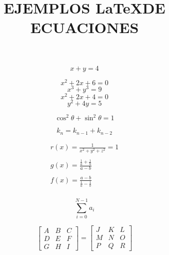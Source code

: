 \documentclass{article}
\title{EJEMPLOS \LaTeX DE ECUACIONES}
\begin{document}
\maketitle
    \begin{equation}  
        x + y = 4 %
    \end{equation}  
        \newline
        
    \begin{equation}      
        x^2 +2x+ 6 = 0               
    \end{equation}  
    \begin{equation} 
        x^3 + y^3 = 9   
    \end{equation}  
    \begin{equation}  
        x^2 + 2x + 4 = 0   
    \end{equation}  
    \begin{equation}  
        y^2 + 4y = 5   
    \end{equation} 
    \newline

    \begin{equation}  
        \cos^2 \theta + \sin^2 \theta = 1  
    \end{equation}  
    \newline

    \begin{equation}
        k_n = k_{n-1} + k_{n-2}  
    \end{equation}

    \begin{align*}  
        r(x) = \frac{1}{x^2 + y^2 + z^2} = 1 \\ \\ %
        g(x) = \frac{\frac{1}{a}+\frac{1}{b}}{a - b} \\ \\  
        f(x) = \frac{a - b}{\frac{1}{a} - \frac{1}{b}} \\  
    \end{align*}  

    \begin{equation}  
        \sum_{i=0}^{N - 1} a_i %
    \end{equation}  


    \[  
        \begin{bmatrix} %
        A & B & C \\  
        D & E & F \\  
        G & H & I   
        \end{bmatrix}  
        =  
        \begin{bmatrix}  
        J & K & L \\  
        M & N & O \\  
        P & Q & R  
        \end{bmatrix}  
    \]  
\end{document}
